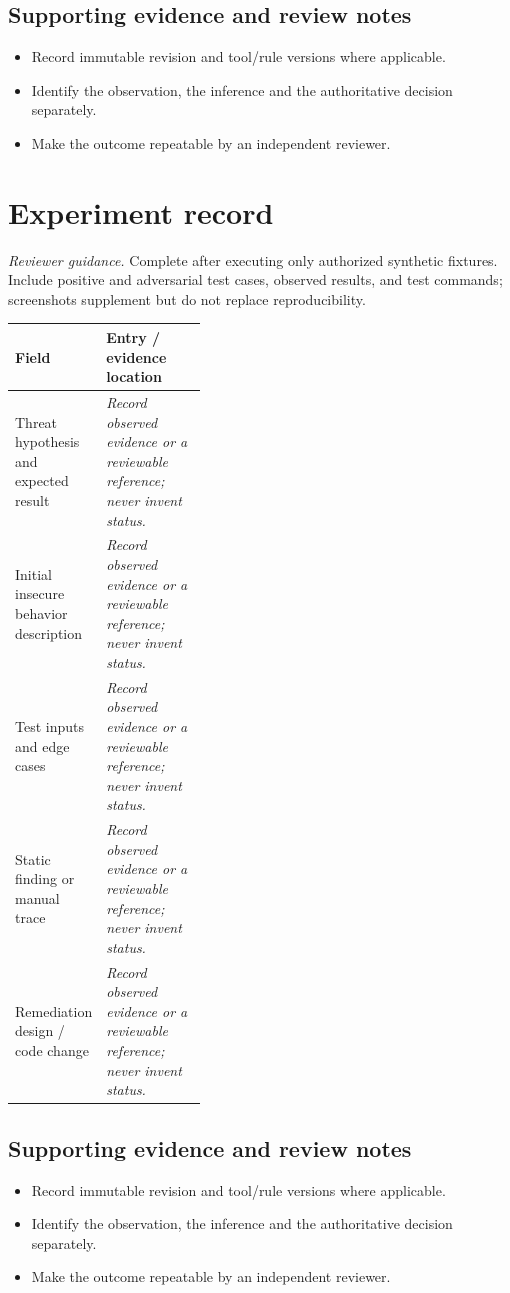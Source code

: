 \documentclass[10pt,letterpaper]{article}
\begin{document}
\subsection{Supporting evidence and review notes}
\begin{itemize}
\item Record immutable revision and tool/rule versions where applicable.
\item Identify the observation, the inference and the authoritative decision separately.
\item Make the outcome repeatable by an independent reviewer.
\end{itemize}
\clearpage
\section{Experiment record}
\textit{Reviewer guidance.} Complete after executing only authorized synthetic fixtures. Include positive and adversarial test cases, observed results, and test commands; screenshots supplement but do not replace reproducibility.
\begin{tabularx}{\linewidth}{@{}p{0.38\linewidth}Y@{}}
\toprule Field & Entry / evidence location\\\midrule
Threat hypothesis and expected result & \textit{Record observed evidence or a reviewable reference; never invent status.}\\[1.0em]
\midrule
Initial insecure behavior description & \textit{Record observed evidence or a reviewable reference; never invent status.}\\[1.0em]
\midrule
Test inputs and edge cases & \textit{Record observed evidence or a reviewable reference; never invent status.}\\[1.0em]
\midrule
Static finding or manual trace & \textit{Record observed evidence or a reviewable reference; never invent status.}\\[1.0em]
\midrule
Remediation design / code change & \textit{Record observed evidence or a reviewable reference; never invent status.}\\[1.0em]
\midrule
\end{tabularx}
\subsection{Supporting evidence and review notes}
\begin{itemize}
\item Record immutable revision and tool/rule versions where applicable.
\item Identify the observation, the inference and the authoritative decision separately.
\item Make the outcome repeatable by an independent reviewer.
\end{itemize}
\clearpage
\end{document}
